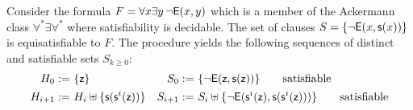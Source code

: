\begin{example}
	Consider the formula 
	$F = \forall x\exists y\,\lnot{\mathsf{E}}(x,y)$
	which is a member of the Ackermann class $\forall^*\exists\forall^*$ 
	where satisfiability is decidable.
	The set of clauses 
	$S = \{ \lnot{\mathsf{E}}(x,{\mathsf s}(x)) \}$ is equisatisfiable to $F$.
	The procedure yields the following sequences of distinct and satisfiable sets $S_{k\geq0}$:
	\begin{align*}
	H_{0} :=&\  \{ {\mathsf z} \} 
	&
	S_{0} :=&\ \{ \lnot{\mathsf{E}}({\mathsf z},{\mathsf s}({\mathsf z}))
	\}
	\tag*{satisfiable}
	\\
	H_{i+1} :=&\ H_i \uplus \{ {\mathsf s}({\mathsf s}^{i}({\mathsf z})) \} 
	&
	S_{i+1} :=&\ S_i \uplus 
	\{
	\lnot{\mathsf{E}}({\mathsf s}^i({\mathsf z}),{\mathsf s}({\mathsf s}^i({\mathsf z})))
	\}
	\tag*{satisfiable}
	\end{align*}
\end{example}


\begin{example}\label{ex:simplesat}
\end{example}

 

\begin{example}\label{ex:succ}
\end{example}

